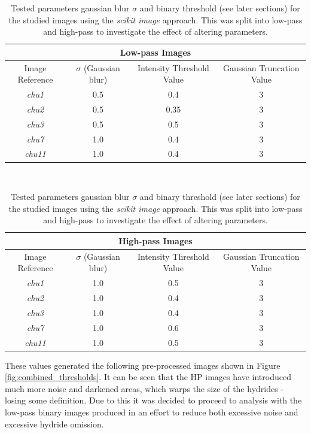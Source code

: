 \documentclass{article}
\begin{document}
	\begin{table}[ht]
	\begin{center}
	\begin{tabular}{ |c|c|c|c| } 
		\hline
		\multicolumn{4}{|c|}{Low-pass Images} \\
		\hline
		Image Reference & $\sigma$ (Gaussian blur) & Intensity Threshold Value & Gaussian Truncation Value \\
		\hline
		\textit{chu1} & 0.5 & 0.4 & 3 \\ 
		\textit{chu2} & 0.5 & 0.35 & 3 \\ 
		\textit{chu3} & 0.5 & 0.5 & 3 \\ 
		\textit{chu7} & 1.0 & 0.4 & 3 \\ 
		\textit{chu11} & 1.0 & 0.4 & 3 \\ 
		\hline
	\end{tabular}
	\\
	\begin{tabular}{ |c|c|c|c| } 
		\hline
		\multicolumn{4}{|c|}{High-pass Images} \\
		\hline
		Image Reference & $\sigma$ (Gaussian blur) & Intensity Threshold Value & Gaussian Truncation Value \\
		\hline
		\textit{chu1} & 1.0 & 0.5 & 3 \\ 
		\textit{chu2} & 1.0 & 0.4 & 3 \\ 
		\textit{chu3} & 1.0 & 0.4 & 3 \\ 
		\textit{chu7} & 1.0 & 0.6 & 3 \\ 
		\textit{chu11} & 1.0 & 0.5 & 3 \\ 
		\hline
	\end{tabular}
	\caption{Tested parameters gaussian blur $\sigma$ and binary threshold (see later sections) for the studied images using the \textit{scikit image} approach. This was split into low-pass and high-pass to investigate the effect of altering parameters.}
	\label{tab:imageprocessing}
	\end{center}
	\end{table}
	
    These values generated the following pre-processed images shown in Figure \ref{fig:combined_thresholds}. It can be seen that the HP images have introduced much more noise and darkened areas, which warps the size of the hydrides - losing some definition. Due to this it was decided to proceed to analysis with the low-pass binary images produced in an effort to reduce both excessive noise and excessive hydride omission.
\end{document}
